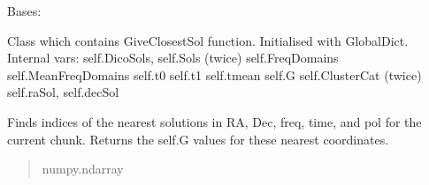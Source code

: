 \documentclass[letterpaper,10pt,english]{sphinxmanual}
\begin{document}
\begin{fulllineitems}
\label{\detokenize{api/killMS.Wirtinger:killMS.Wirtinger.ClassSolPredictMachine.ClassSolPredictMachine}}
\pysigstartsignatures
{}
\pysigstopsignatures
\sphinxAtStartPar
Bases: 

\sphinxAtStartPar
Class which contains GiveClosestSol function.
Initialised with GlobalDict.
Internal vars:
self.DicoSols,
self.Sols (twice)
self.FreqDomains
self.MeanFreqDomains
self.t0
self.t1
self.tmean
self.G
self.ClusterCat (twice)
self.raSol, self.decSol

\begin{fulllineitems}
\label{\detokenize{api/killMS.Wirtinger:killMS.Wirtinger.ClassSolPredictMachine.ClassSolPredictMachine.GiveClosestSol}}
\pysigstartsignatures
{}
\pysigstopsignatures
\sphinxAtStartPar
Finds indices of the nearest solutions in RA, Dec, freq, time, and pol
for the current chunk. Returns the self.G values for these nearest coordinates.
\begin{quote}\begin{description}
\sphinxAtStartPar
numpy.ndarray

\end{description}\end{quote}

\end{fulllineitems}


\end{fulllineitems}

\end{document}
